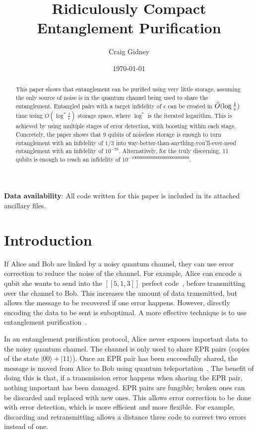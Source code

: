 \documentclass[onecolumn,unpublished,a4paper]{quantumarticle}
\theoremstyle{definition}
\theoremstyle{definition}
\theoremstyle{definition}
\begin{document}
\title{Ridiculously Compact Entanglement Purification}

\date{\today}
\author{Craig Gidney}

\begin{abstract}
This paper shows that entanglement can be purified using very little storage, assuming the only source of noise is in the quantum channel being used to share the entanglement.
Entangled pairs with a target infidelity of $\epsilon$ can be created in $\Tilde{O}(\log \frac{1}{\epsilon})$ time using $O(\log^{\ast} \frac{1}{\epsilon})$ storage space, where $\log^{\ast}$ is the iterated logarithm.
This is achieved by using multiple stages of error detection, with boosting within each stage.
Concretely, the paper shows that 9 qubits of noiseless storage is enough to turn entanglement with an infidelity of $1/3$ into way-better-than-anything-you'll-ever-need entanglement with an infidelity of $10^{-78}$.
Alternatively, for the truly discerning, 11 qubits is enough to reach an infidelity of $10^{-1000000000000000000000000000}$.
\end{abstract}

\textbf{Data availability}: All code written for this paper is included in its attached ancillary files.

\tableofcontents

\section{Introduction}
\label{sec:introduction}

If Alice and Bob are linked by a noisy quantum channel, they can use error correction to reduce the noise of the channel.
For example, Alice can encode a qubit she wants to send into the $[[5,1,3]]$ perfect code~\cite{laflamma1996perfectcode}, before transmitting over the channel to Bob.
This increases the amount of data transmitted, but allows the message to be recovered if one error happens.
However, directly encoding the data to be sent is suboptimal.
A more effective technique is to use entanglement purification~\cite{bennett1995eprpurify}.

In an entanglement purification protocol, Alice never exposes important data to the noisy quantum channel.
The channel is only used to share EPR pairs (copies of the state $|00\rangle + |11\rangle$).
Once an EPR pair has been successfully shared, the message is moved from Alice to Bob using quantum teleportation~\cite{bennett1993teleportation}.
The benefit of doing this is that, if a transmission error happens when sharing the EPR pair, nothing important has been damaged.
EPR pairs are fungible; broken ones can be discarded and replaced with new ones.
This allows error correction to be done with error detection, which is more efficient and more flexible.
For example, discarding and retransmitting allows a distance three code to correct two errors instead of one.
\end{document}
